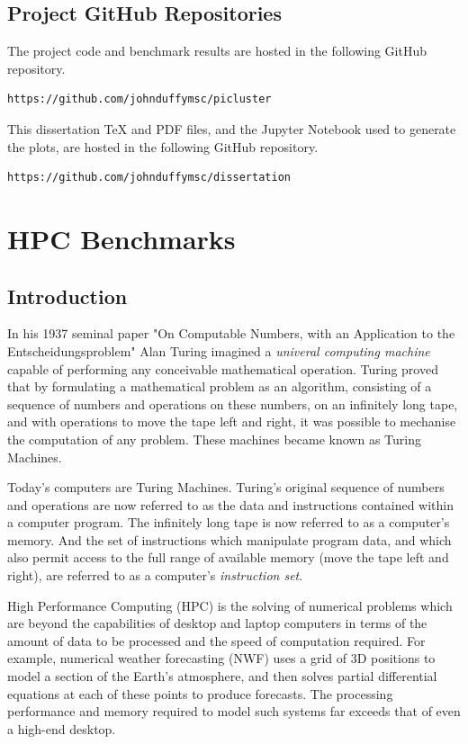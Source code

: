 \documentclass{report}
\begin{document}
%
%
\section{Project GitHub Repositories}

The project code and benchmark results are hosted in the following GitHub repository.

\begin{verbatim}
https://github.com/johnduffymsc/picluster
\end{verbatim}

This dissertation TeX and PDF files, and the Jupyter Notebook used to generate the plots, are hosted in the following GitHub repository.

\begin{verbatim}
https://github.com/johnduffymsc/dissertation
\end{verbatim}
 


%
%
\chapter{HPC Benchmarks}

\section{Introduction}

In his 1937 seminal paper "On Computable Numbers, with an Application to the Entscheidungsproblem" Alan Turing imagined a \emph{univeral computing machine} capable of performing any conceivable mathematical operation. Turing proved that by formulating a mathematical problem as an algorithm, consisting of a sequence of numbers and operations on these numbers, on an infinitely long tape, and with operations to move the tape left and right, it was possible to mechanise the computation of any problem. These machines became known as Turing Machines. 

Today's computers are Turing Machines. Turing's original sequence of numbers and operations are now referred to as the data and  instructions contained within a computer program. The infinitely long tape is now referred to as a computer's memory. And the set of instructions which manipulate program data, and which also permit access to the full range of available memory (move the tape left and right), are referred to as a computer's \emph{instruction set}.

High Performance Computing (HPC) is the solving of numerical problems which are beyond the capabilities of desktop and laptop computers in terms of the amount of data to be processed and the speed of computation required. For example, numerical weather forecasting (NWF) uses a grid of 3D positions to model a section of the Earth's atmosphere, and then solves partial differential equations at each of these points to produce forecasts. The processing performance and memory required to model such systems far exceeds that of even a high-end desktop. 
\end{document}

